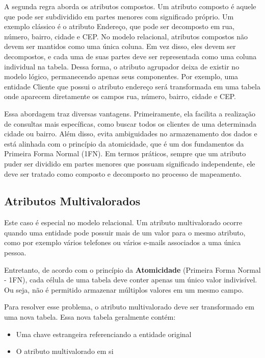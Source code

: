 A segunda regra aborda os atributos compostos. Um atributo composto é aquele que pode ser subdividido em partes menores com significado próprio. Um exemplo clássico é o atributo Endereço, que pode ser decomposto em rua, número, bairro, cidade e CEP. No modelo relacional, atributos compostos não devem ser mantidos como uma única coluna. Em vez disso, eles devem ser decompostos, e cada uma de suas partes deve ser representada como uma coluna individual na tabela. Dessa forma, o atributo agrupador deixa de existir no modelo lógico, permanecendo apenas seus componentes. Por exemplo, uma entidade Cliente que possui o atributo endereço será transformada em uma tabela onde aparecem diretamente os campos rua, número, bairro, cidade e CEP.

Essa abordagem traz diversas vantagens. Primeiramente, ela facilita a realização de consultas mais específicas, como buscar todos os clientes de uma determinada cidade ou bairro. Além disso, evita ambiguidades no armazenamento dos dados e está alinhada com o princípio da atomicidade, que é um dos fundamentos da Primeira Forma Normal (1FN). Em termos práticos, sempre que um atributo puder ser dividido em partes menores que possuam significado independente, ele deve ser tratado como composto e decomposto no processo de mapeamento.
\subsection{Atributos Multivalorados}

Este caso é especial no modelo relacional. Um atributo multivalorado ocorre quando uma entidade pode possuir mais de um valor para o mesmo atributo, como por exemplo vários telefones ou vários e-mails associados a uma única pessoa.

Entretanto, de acordo com o princípio da \textbf{Atomicidade} (Primeira Forma Normal - 1FN), cada célula de uma tabela deve conter apenas um único valor indivisível. Ou seja, não é permitido armazenar múltiplos valores em um mesmo campo.

Para resolver esse problema, o atributo multivalorado deve ser transformado em uma nova tabela. Essa nova tabela geralmente contém:
\begin{itemize}
    \item Uma chave estrangeira referenciando a entidade original
    \item O atributo multivalorado em si
\end{itemize}

